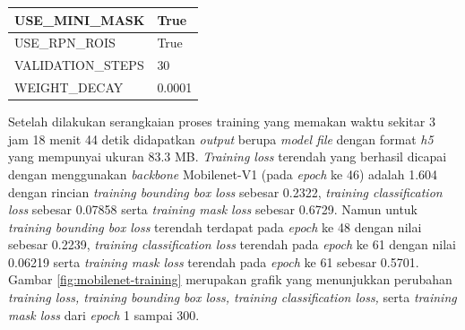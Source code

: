 \begin{longtable}[h]{|l|l|}
	USE\_MINI\_MASK                 & True                                                                                                                                                                                   \\ \hline
	USE\_RPN\_ROIS                  & True                                                                                                                                                                                   \\ \hline
	VALIDATION\_STEPS               & 30                                                                                                                                                                                     \\ \hline
	WEIGHT\_DECAY                   & 0.0001                                                                                                                                                                                 \\ \hline
\end{longtable}

Setelah dilakukan serangkaian proses training yang memakan waktu sekitar 3 jam 18 menit 44 detik didapatkan \textit{output} berupa \textit{model file}  dengan format \textit{h5} yang mempunyai ukuran 83.3 MB. \textit{Training loss} terendah yang berhasil dicapai dengan menggunakan \textit{backbone} Mobilenet-V1 (pada \textit{epoch} ke 46) adalah 1.604 dengan rincian \textit{training bounding box loss} sebesar 0.2322, \textit{training classification loss} sebesar 0.07858 serta \textit{training mask loss} sebesar 0.6729. Namun untuk \textit{training bounding box loss} terendah terdapat pada \textit{epoch} ke 48 dengan nilai sebesar 0.2239, \textit{training classification loss} terendah pada \textit{epoch} ke 61 dengan nilai 0.06219 serta \textit{training mask loss} terendah pada \textit{epoch} ke 61 sebesar 0.5701. Gambar \ref{fig:mobilenet-training} merupakan grafik yang menunjukkan perubahan \textit{training loss, training bounding box loss, training classification loss,} serta \textit{training mask loss} dari \textit{epoch} 1 sampai 300. 

